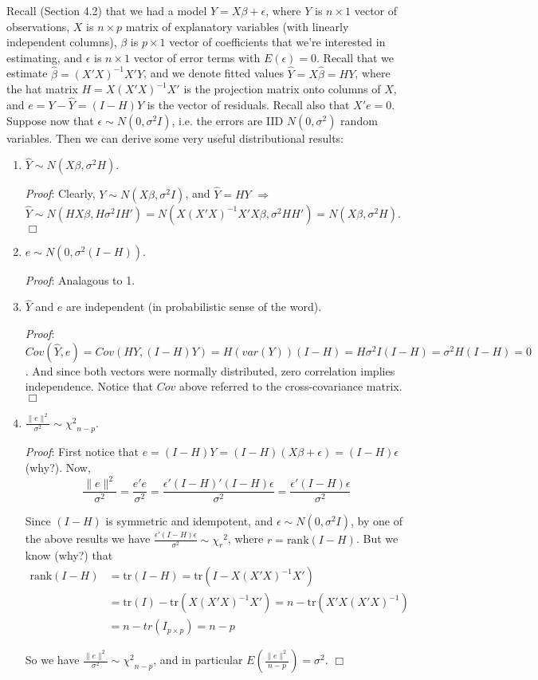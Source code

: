 \documentclass[12pt,oneside]{article}
\begin{document}
Recall (Section 4.2)
that we had a model $Y = X\beta + \epsilon$, where $Y$ is $n \times 1$
vector of observations, $X$ is $n \times p$ matrix of explanatory
variables (with linearly independent columns), $\beta$ is $p \times 1$
vector of coefficients that we're interested in estimating, and
$\epsilon$ is $n \times 1$ vector of error terms with $E(\epsilon) =
0$. Recall that we estimate $\hat{\beta} = (X'X)^{-1}X'Y$, and we
denote fitted values $\hat{Y} = X \hat{\beta} = HY$, where the hat matrix $H=
X(X'X)^{-1}X'$ is the projection matrix onto columns of $X$, and $e =
Y - \hat{Y} = (I-H)Y$ is the vector of residuals. Recall also that
$X'e = 0$. Suppose now that $\epsilon \sim N(0, \sigma^2 I)$, i.e. the
errors are IID $N(0, \sigma^2)$ random variables. Then we can derive
some very useful distributional results:
\begin{enumerate}
\item $\hat{Y} \sim N(X \beta, \sigma^2 H)$.

\emph{Proof}: Clearly, $Y \sim
  N(X \beta, \sigma^2 I)$, and $\hat{Y} = HY$ $\Longrightarrow$
  $\hat{Y} \sim N(HX \beta, H \sigma^2 I H') = N(X(X'X)^{-1}X'X \beta,
  \sigma^2 HH') = N(X \beta, \sigma^2 H)$. $\Box$

\item $e \sim N(0, \sigma^2 (I-H))$.

\emph{Proof}: Analagous to 1.

\item $\hat{Y}$ and $e$ are independent (in probabilistic sense of the
  word).

\emph{Proof}: $Cov(\hat{Y}, e) = Cov(HY, (I-H)Y) = H (var(Y)) (I-H) =
  H \sigma^2 I (I-H) = \sigma^2 H(I-H) = 0$. And since both vectors
  were normally distributed, zero correlation implies
  independence. Notice that $Cov$ above referred to the
  cross-covariance matrix. $\Box$

\item $\frac{\|e\|^2}{\sigma^2} \sim {\chi^2}_{n-p}$.

\emph{Proof}: First
  notice that $e = (I - H)Y = (I - H)(X \beta + \epsilon) = (I-H)\epsilon$ (why?). Now, 
  $$\frac{\|e\|^2}{\sigma^2} = \frac{e'e}{\sigma^2} = \frac{\epsilon' (I-H)'(I-H)\epsilon}{\sigma^2} = \frac{\epsilon' (I-H)\epsilon}{\sigma^2}$$
  
  Since $(I-H)$ is symmetric and idempotent, and $\epsilon \sim N(0, \sigma^2 I)$, by one of the above results we have $\frac{\epsilon' (I-H) \epsilon}{\sigma^2} \sim {\chi_r}^2$, where $r = \text{rank}(I-H)$. But we know (why?) that 
   $$\begin{aligned} \text{rank}(I-H) &= \text{tr}(I-H) = \text{tr}(I - X(X'X)^{-1}X')\\ 
  &= \text{tr}(I) - \text{tr}(X(X'X)^{-1}X') = n - \text{tr}(X'X(X'X)^{-1})\\
  &= n - tr(I_{p \times p}) = n - p \end{aligned}$$ 
  
  So we have $\frac{\|e\|^2}{\sigma^2} \sim {\chi^2}_{n-p}$, and in particular $E(\frac{\|e\|^2}{n-p}) = \sigma^2$.  $\Box$
\end{enumerate}
\end{document}
